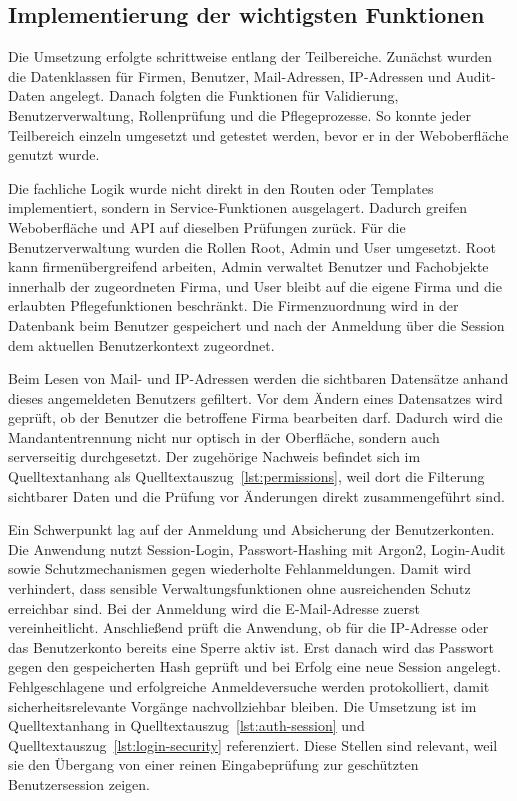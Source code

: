 \subsection{Implementierung der wichtigsten Funktionen}
\label{sec:ImplementierungKernfunktionen}
Die Umsetzung erfolgte schrittweise entlang der Teilbereiche.
Zunächst wurden die Datenklassen für Firmen, Benutzer, Mail-Adressen,
IP-Adressen und Audit-Daten angelegt. Danach folgten die Funktionen für
Validierung, Benutzerverwaltung, Rollenprüfung und die Pflegeprozesse. So
konnte jeder Teilbereich einzeln umgesetzt und getestet werden, bevor er in der
Weboberfläche genutzt wurde.

Die fachliche Logik wurde nicht direkt in den Routen oder Templates
implementiert, sondern in Service-Funktionen ausgelagert. Dadurch greifen
Weboberfläche und API auf dieselben Prüfungen zurück. Für die
Benutzerverwaltung wurden die Rollen Root, Admin und User umgesetzt. Root kann
firmenübergreifend arbeiten, Admin verwaltet Benutzer und Fachobjekte innerhalb
der zugeordneten Firma, und User bleibt auf die eigene Firma und die erlaubten
Pflegefunktionen beschränkt. Die Firmenzuordnung wird in der Datenbank beim
Benutzer gespeichert und nach der Anmeldung über die Session dem aktuellen
Benutzerkontext zugeordnet.

Beim Lesen von Mail- und IP-Adressen werden die sichtbaren Datensätze anhand
dieses angemeldeten Benutzers gefiltert. Vor dem Ändern eines Datensatzes wird
geprüft, ob der Benutzer die betroffene Firma bearbeiten darf.
Dadurch wird die Mandantentrennung nicht nur optisch in der Oberfläche, sondern
auch serverseitig durchgesetzt. Der zugehörige Nachweis befindet sich im
Quelltextanhang  als
Quelltextauszug~\ref{lst:permissions}, weil dort die Filterung sichtbarer Daten
und die Prüfung vor Änderungen direkt zusammengeführt sind.

Ein Schwerpunkt lag auf der Anmeldung und Absicherung der Benutzerkonten. Die
Anwendung nutzt Session-Login, Passwort-Hashing mit Argon2, Login-Audit sowie
Schutzmechanismen gegen wiederholte Fehlanmeldungen. Damit wird verhindert,
dass sensible Verwaltungsfunktionen ohne ausreichenden Schutz erreichbar sind.
Bei der Anmeldung wird die E-Mail-Adresse zuerst vereinheitlicht. Anschließend
prüft die Anwendung, ob für die IP-Adresse oder das Benutzerkonto bereits eine
Sperre aktiv ist. Erst danach wird das Passwort gegen den gespeicherten Hash
geprüft und bei Erfolg eine neue Session angelegt. Fehlgeschlagene und
erfolgreiche Anmeldeversuche werden protokolliert, damit sicherheitsrelevante
Vorgänge nachvollziehbar bleiben. Die Umsetzung ist im Quelltextanhang
 in Quelltextauszug~\ref{lst:auth-session}
und Quelltextauszug~\ref{lst:login-security} referenziert. Diese Stellen sind
relevant, weil sie den Übergang von einer reinen Eingabeprüfung zur geschützten
Benutzersession zeigen.

